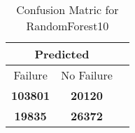 \begin{table}[] 
\caption{Confusion Matric for RandomForest10} 
\label{Table: Prediction Accuracy-DMDRandomForest10OnlySunEKF-resetReflectionEKF-top2-Reflection} 
\centering 
\begin{tabular} 
 {@{}ccc@{}} 
\toprule 
\multicolumn{2}{c}{\textbf{Predicted}}
 \\ \midrule 
\multicolumn{1}{|c|}{Failure} & 
\multicolumn{1}{c|}{No Failure}
 \\ \midrule 
\multicolumn{1}{|c|}{\color{green}\textbf{103801}} & 
\multicolumn{1}{c|}{\color{red}\textbf{20120}}
 \\ \midrule 
\multicolumn{1}{|c|}{\color{red}\textbf{19835}} & 
\multicolumn{1}{c|}{\color{green}\textbf{26372}}
 \\ \bottomrule 
\end{tabular} 
\end{table} 
